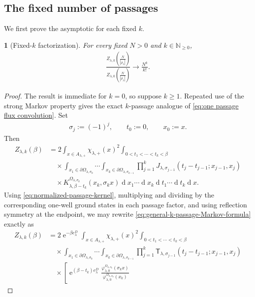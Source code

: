 \documentclass[a4paper,10pt]{article}
\numberwithin{equation}{section}
\theoremstyle{plain}
\theoremstyle{plain}
\newtheorem{lem}[thm]{\protect\lemmaname}
\theoremstyle{plain}
\theoremstyle{plain}
\theoremstyle{plain}
\theoremstyle{remark}
\theoremstyle{definition}
\providecommand{\lemmaname}{Lemma}
\newcommand{\ee}{\operatorname{e}}
\newcommand{\NN}{\mathbb{N}}
\newcommand{\dif}{\operatorname{d}\!} %
\newcommand{\vf}{\varphi}
\newcommand{\abs}[1]{\left\lvert#1\right\rvert}
\newcommand{\eq}[1]{\begin{align*}#1\end{align*}}
\newcommand{\br}[1]{\left(#1\right)}
\begin{document}
\subsection{The fixed number of passages}

We first prove the asymptotic for each fixed $k$.

\begin{lem}[Fixed-$k$ factorization]
\label{lem:fixed-k-factorization}
For every fixed $N>0$ and $k\in\NN_{\geq0}$,
\eq{
\frac{
Z_{\lambda,k}\br{\frac{N}{\abs{\rho_\lambda}}}
}{
Z_{\lambda,0}\br{\frac{N}{\abs{\rho_\lambda}}}
}
\longrightarrow
\frac{N^k}{k!}.
}
\end{lem}

\begin{proof}
The result is immediate for $k=0$, so suppose $k\geq1$. Repeated use of the strong Markov property gives the exact $k$-passage analogue of \cref{eq:one passage flux convolution}. Set
\eq{
\sigma_j:=(-1)^j,
\qquad
t_0:=0,
\qquad
x_0:=x.
}
Then
\begin{align}
Z_{\lambda,k}(\beta)
&=
2\int_{x\in A_{\lambda,+}}
\chi_{\lambda,+}(x)^2
\int_{0<t_1<\cdots<t_k<\beta}
\nonumber\\
&\quad\times
\int_{x_1\in\partial\Omega_{\lambda,\sigma_0}}
\cdots
\int_{x_k\in\partial\Omega_{\lambda,\sigma_{k-1}}}
\prod_{j=1}^k
J_{\lambda,\sigma_{j-1}}
\br{t_j-t_{j-1};x_{j-1},x_j}
\nonumber\\
&\quad\times
K_{\lambda,\beta-t_k}^{\Omega_{\lambda,\sigma_k}}
\br{x_k,\sigma_kx}
\dif{x_1}\cdots\dif{x_k}
\dif{t_1}\cdots\dif{t_k}\dif{x}.
\label{eq:general-k-passage-Markov-formula}
\end{align}
Using \cref{eq:normalized-passage-kernel}, multiplying and dividing by the corresponding one-well ground states in each passage factor, and using reflection symmetry at the endpoint, we may rewrite \cref{eq:general-k-passage-Markov-formula} exactly as
\begin{align}
Z_{\lambda,k}(\beta)
&=
2\ee^{-\beta e_\lambda^D}
\int_{x\in A_{\lambda,+}}
\chi_{\lambda,+}(x)^2
\int_{0<t_1<\cdots<t_k<\beta}
\nonumber\\
&\quad\times
\int_{x_1\in\partial\Omega_{\lambda,\sigma_0}}
\cdots
\int_{x_k\in\partial\Omega_{\lambda,\sigma_{k-1}}}
\prod_{j=1}^k
\mathsf T_{\lambda,\sigma_{j-1}}
\br{t_j-t_{j-1};x_{j-1},x_j}
\nonumber\\
&\quad\times
\left[
\ee^{(\beta-t_k)e_\lambda^D}
\frac{
\vf_{\lambda,0}^{\Omega_{\lambda,\sigma_k}}(\sigma_kx)
}{
\vf_{\lambda,0}^{\Omega_{\lambda,\sigma_k}}(x_k)
}
\end{align}
\end{proof}
\end{document}
